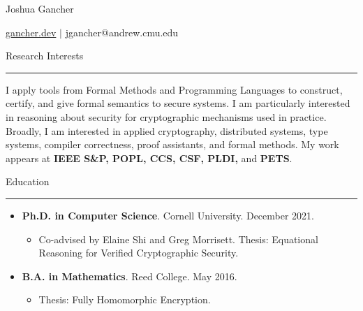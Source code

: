 \documentclass{article}
\newcommand{\rsection}[1]{\vspace{1em} {\huge #1} \vspace{0.5em} \hrule \vspace{1em}}
\begin{document}
\begin{center}
    \Huge Joshua Gancher
\end{center}
\begin{center}
    \url{gancher.dev} $\mid$ jgancher@andrew.cmu.edu 
 \end{center}

\rsection{Research Interests}

I apply tools from Formal Methods and Programming Languages 
to construct,
certify, and give formal semantics to secure systems.
I am particularly interested in reasoning about security for cryptographic
mechanisms used in practice.
Broadly, I am interested in applied cryptography, distributed systems, type systems, compiler
correctness, proof assistants, and formal methods. My work appears at 
\textbf{IEEE S\&P, POPL, CCS, CSF, PLDI,} and \textbf{PETS}. 

\rsection{Education}
\begin{itemize}
    \item {\bf Ph.D. in Computer Science}. Cornell University. December 2021.
        \begin{itemize}
            \item Co-advised by Elaine Shi and Greg Morrisett. Thesis:  Equational Reasoning for Verified Cryptographic
                Security.
        \end{itemize}
    \item {\bf B.A. in Mathematics}. Reed College. May 2016.
        \begin{itemize}
            \item Thesis: Fully Homomorphic Encryption.
        \end{itemize}
\end{itemize}
\end{document}
